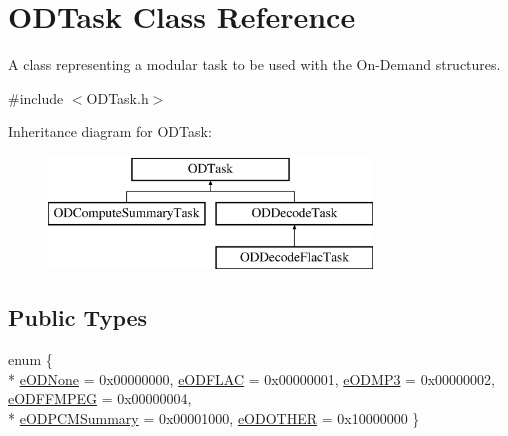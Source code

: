 \hypertarget{class_o_d_task}{}\section{O\+D\+Task Class Reference}
\label{class_o_d_task}


A class representing a modular task to be used with the On-\/\+Demand structures.  




{\ttfamily \#include $<$O\+D\+Task.\+h$>$}

Inheritance diagram for O\+D\+Task\+:\begin{figure}[H]
\begin{center}
\leavevmode
\includegraphics[height=3.000000cm]{class_o_d_task}
\end{center}
\end{figure}
\subsection*{Public Types}
\begin{DoxyCompactItemize}
\item 
enum \{ \\*
\hyperlink{class_o_d_task_a5cb005afe9c31c34738c6d20da077d78a7650c98bb4a17c4201653e2cb41a86d8}{e\+O\+D\+None} = 0x00000000, 
\hyperlink{class_o_d_task_a5cb005afe9c31c34738c6d20da077d78affeff343487da8ae57703491f67161c9}{e\+O\+D\+F\+L\+AC} = 0x00000001, 
\hyperlink{class_o_d_task_a5cb005afe9c31c34738c6d20da077d78a52ad3a931a1b6ce3f08548b4befb30d8}{e\+O\+D\+M\+P3} = 0x00000002, 
\hyperlink{class_o_d_task_a5cb005afe9c31c34738c6d20da077d78ad88bca25826172c0537150b614462c0c}{e\+O\+D\+F\+F\+M\+P\+EG} = 0x00000004, 
\\*
\hyperlink{class_o_d_task_a5cb005afe9c31c34738c6d20da077d78a36e0f57063d422bebdf739f3cd6a7acc}{e\+O\+D\+P\+C\+M\+Summary} = 0x00001000, 
\hyperlink{class_o_d_task_a5cb005afe9c31c34738c6d20da077d78a70f494ea98b133cab297ee84953ce6a4}{e\+O\+D\+O\+T\+H\+ER} = 0x10000000
 \}
\end{DoxyCompactItemize}
